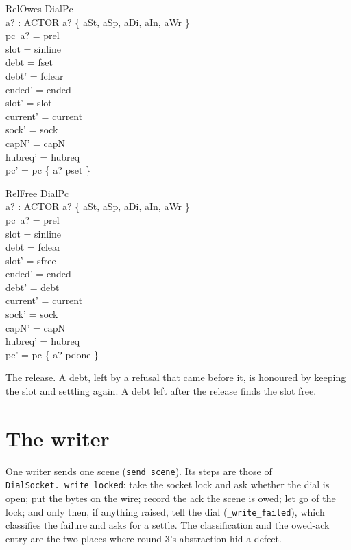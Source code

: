 \documentclass[a4paper,10pt,fleqn]{article}
\begin{document}
\begin{schema}{RelOwes}
  DialPc \\
  a? : ACTOR
\where
  a? \in \{ aSt, aSp, aDi, aIn, aWr \} \\
  pc~a? = prel \\
  slot = sinline \\
  debt = fset \\
  debt' = fclear \\
  ended' = ended \\
  slot' = slot \\
  current' = current \\
  sock' = sock \\
  capN' = capN \\
  hubreq' = hubreq \\
  pc' = pc \oplus \{ a? \mapsto pset \}
\end{schema}

\begin{schema}{RelFree}
  DialPc \\
  a? : ACTOR
\where
  a? \in \{ aSt, aSp, aDi, aIn, aWr \} \\
  pc~a? = prel \\
  slot = sinline \\
  debt = fclear \\
  slot' = sfree \\
  ended' = ended \\
  debt' = debt \\
  current' = current \\
  sock' = sock \\
  capN' = capN \\
  hubreq' = hubreq \\
  pc' = pc \oplus \{ a? \mapsto pdone \}
\end{schema}

The release.  A debt, left by a refusal that came before it, is honoured by
keeping the slot and settling again.  A debt left after the release finds the
slot free.

\section{The writer}

One writer sends one scene (\texttt{send\_scene}).  Its steps are those of
\texttt{DialSocket.\_write\_locked}: take the socket lock and ask whether the
dial is open; put the bytes on the wire; record the ack the scene is owed; let go
of the lock; and only then, if anything raised, tell the dial
(\texttt{\_write\_failed}), which classifies the failure and asks for a settle.
The classification and the owed-ack entry are the two places where round 3's
abstraction hid a defect.
\end{document}
